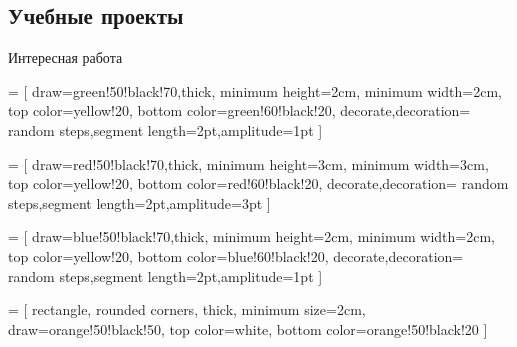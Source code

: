 \subsection{Учебные проекты}

\begin{frame}{Интересная работа}

    \begin{center}
             = [
                draw=green!50!black!70,thick,
                minimum height=2cm,
                minimum width=2cm,
                top color=yellow!20,
                bottom color=green!60!black!20,
                decorate,decoration={
                    random steps,segment length=2pt,amplitude=1pt
                }
            ]

             = [
                draw=red!50!black!70,thick,
                minimum height=3cm,
                minimum width=3cm,
                top color=yellow!20,
                bottom color=red!60!black!20,
                decorate,decoration={
                    random steps,segment length=2pt,amplitude=3pt
                }
            ]

             = [
                draw=blue!50!black!70,thick,
                minimum height=2cm,
                minimum width=2cm,
                top color=yellow!20,
                bottom color=blue!60!black!20,
                decorate,decoration={
                    random steps,segment length=2pt,amplitude=1pt
                }
            ]

             = [
                rectangle, rounded corners,
                thick,
                minimum size=2cm,
                draw=orange!50!black!50,
                top color=white,
                bottom color=orange!50!black!20
            ]


\end{center}
\end{frame}
